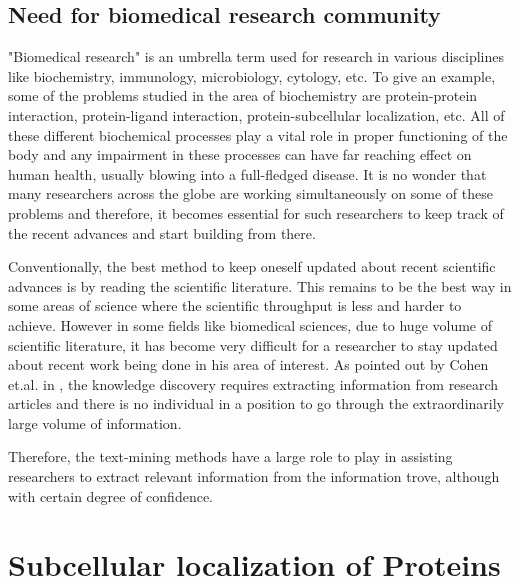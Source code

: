 \subsection*{Need for biomedical research community}

"Biomedical research" is an umbrella term used for research in various disciplines like biochemistry, immunology, microbiology, cytology, etc. To give an example, some of the problems studied in the area of biochemistry are protein-protein interaction, protein-ligand interaction, protein-subcellular localization, etc. All of these different biochemical processes play a vital role in proper functioning of the body and any impairment in these processes can have far reaching effect on human health, usually blowing into a full-fledged disease. It is no wonder that many researchers across the globe are working simultaneously on some of these problems and therefore, it becomes essential for such researchers to keep track of the recent advances and start building from there. 

Conventionally, the best method to keep oneself updated about recent scientific advances is by reading the scientific literature. This remains to be the best way in some areas of science where the scientific throughput is less and harder to achieve. However in some fields like biomedical sciences, due to huge volume of scientific literature, it has become very difficult for a researcher to stay updated about recent work being done in his area of interest. As pointed out by Cohen et.al. in \cite{cohen2005survey}, the knowledge discovery requires extracting information from research articles and there is no individual in a position to go through the extraordinarily large volume of information.

Therefore, the text-mining methods have a large role to play in assisting researchers to extract relevant information from the information trove, although with certain degree of confidence.

\section{Subcellular localization of Proteins}

